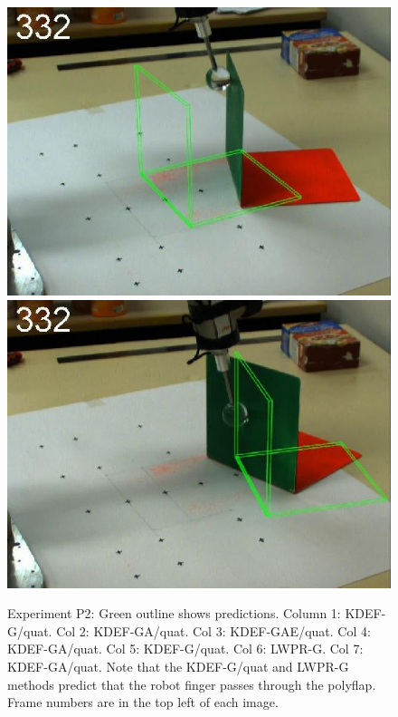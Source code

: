 \begin{figure}[tb]
{\includegraphics[width=\imgBXwid]{./B2_LWPR1_58_5}
\includegraphics[width=\imgBXwid]{./B2_2exp_38_5}
}
\caption
{Experiment P2: Green outline shows predictions. Column 1: KDEF-G/quat. Col 2:
KDEF-GA/quat. Col 3: KDEF-GAE/quat. Col 4: KDEF-GA/quat. Col 5:
KDEF-G/quat. Col 6: LWPR-G. Col 7: KDEF-GA/quat.
Note that the KDEF-G/quat and LWPR-G methods predict
that the robot finger passes through the polyflap.
Frame numbers are in the top left of each image.
}
\label{fig:ExperimentA}
\end{figure}

